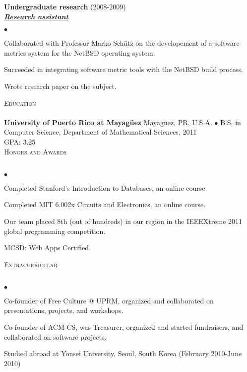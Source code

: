 \documentclass{article}
\newcommand{\lineunder}{\vspace*{-8pt} \\ \hspace*{-18pt} \hrulefill \\}
\newcommand{\header}[1]{{\hspace*{-15pt}\vspace*{6pt} \textsc{#1}} \vspace*{-6pt} \lineunder}
\newcommand{\employer}[3]{{ \textbf{#1} (#2)\\ \underline{\textbf{\emph{#3}}}\\  }}
\newenvironment{achievements}{\begin{list}{$\bullet$}{\topsep 0pt \itemsep -2pt}}{\vspace*{4pt}\end{list}}
\newcommand{\school}[4]{
 \textbf{#1} #2 $\bullet$ #3\\
 #4 \\
}
\begin{document}
\employer{Undergraduate research}{2008-2009}{Research assistant}
	\begin{achievements}
	\item Collaborated with Professor Marko Sch\"{u}tz on the developement of a software metrics system for the NetBSD operating system.
	\item Succeeded in integrating software metric tools with the NetBSD build process.
	\item Wrote research paper on the subject.
	\end{achievements}

\header{Education}

\school{University of Puerto Rico at Mayag\"{u}ez}{Mayag\"{u}ez, PR, U.S.A.}{B.S. in Computer Science, Department of Mathematical Sciences, 2011}
{GPA: 3.25}

\header{Honors and Awards}
\begin{achievements}
\item Completed Stanford's Introduction to Databases, an online course.
\item Completed MIT 6.002x Circuits and Electronics, an online course.
\item Our team placed 8th (out of hundreds) in our region in the IEEEXtreme 2011 global programming competition.
\item MCSD: Web Apps Certified.
\end{achievements}


\header{Extracurricular}
\begin{achievements}
\item Co-founder of Free Culture @ UPRM, organized and collaborated on presentations, projects, and workshops.
\item Co-founder of ACM-CS, was Treasurer, organized and started fundraisers, and collaborated on software projects.
\item Studied abroad at Yonsei University, Seoul, South Korea (February 2010-June 2010)
\end{achievements}
\end{document}
